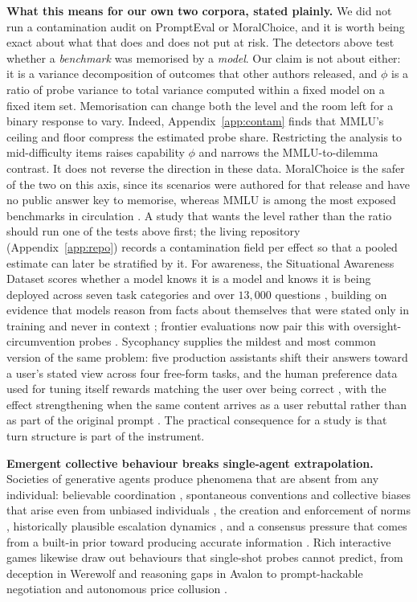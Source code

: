 \documentclass[11pt]{article}
\begin{document}
\textbf{What this means for our own two corpora, stated plainly.} We did not run
a contamination audit on PromptEval or MoralChoice, and it is worth being exact
about what that does and does not put at risk. The detectors above test whether a
\emph{benchmark} was memorised by a \emph{model}. Our claim is not about either:
it is a variance decomposition of outcomes that other authors released, and
$\phi$ is a ratio of probe variance to total variance computed within a fixed
model on a fixed item set. Memorisation can change both the level and the room
left for a binary response to vary. Indeed, Appendix~\ref{app:contam} finds that
MMLU's ceiling and floor compress the estimated probe share. Restricting the
analysis to mid-difficulty items raises capability $\phi$ and narrows the
MMLU-to-dilemma contrast. It does not reverse the direction in these data.
MoralChoice is the safer of the two on this axis, since its scenarios were
authored for that release and have no public answer key to memorise, whereas MMLU
is among the most exposed benchmarks in circulation \cite{sainz2023nlp}. A study
that wants the level rather than the ratio should run one of the tests above
first; the living repository (Appendix~\ref{app:repo}) records a contamination
field per effect so that a pooled estimate can later be stratified by it. For awareness, the Situational
Awareness Dataset scores whether a model knows it is a model and knows it is
being deployed across seven task categories and over $13{,}000$ questions
\cite{laine2024sad}, building on evidence that models reason from facts about
themselves that were stated only in training and never in context
\cite{berglund2023outofcontext}; frontier evaluations now pair this with
oversight-circumvention probes \cite{phuong2025stealth}. Sycophancy supplies the
mildest and most common version of the same problem: five production assistants
shift their answers toward a user's stated view across four free-form tasks, and
the human preference data used for tuning itself rewards matching the user over
being correct \cite{sharma2024sycophancy}, with the effect strengthening when
the same content arrives as a user rebuttal rather than as part of the original
prompt \cite{kim2025rebuttal}. The practical consequence for a study is that
turn structure is part of the instrument.

\textbf{Emergent collective behaviour breaks single-agent extrapolation.}
Societies of generative agents produce phenomena that are absent from any
individual: believable coordination \cite{park2023generative}, spontaneous
conventions and collective biases that arise even from unbiased individuals
\cite{ashery2025emergent}, the creation and enforcement of norms
\cite{ren2024emergence}, historically plausible escalation dynamics
\cite{hua2024waragent}, and a consensus pressure that comes from a built-in
prior toward producing accurate information \cite{chuang2024simulating}. Rich interactive games
likewise draw out behaviours that single-shot probes cannot predict, from
deception in Werewolf \cite{xu2023werewolf} and reasoning gaps in Avalon
\cite{light2023avalonbench} to prompt-hackable negotiation
\cite{bianchi2024negotiation} and autonomous price collusion
\cite{fish2024collusion}.
\end{document}

